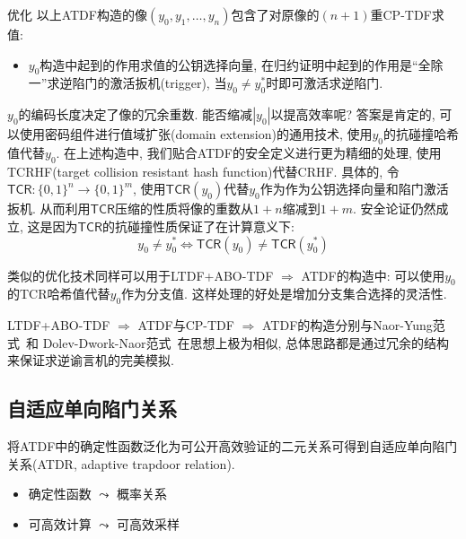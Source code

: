 \begin{remark}{优化}
以上ATDF构造的像$(y_0, y_1, \dots, y_n)$包含了对原像的$(n+1)$重CP-TDF求值:  
\begin{itemize}
    \item $y_0$构造中起到的作用求值的公钥选择向量, 在归约证明中起到的作用是``全除一''求逆陷门的激活扳机(trigger), 当$y_0 \neq y_0^*$时即可激活求逆陷门. 
\end{itemize}

$y_0$的编码长度决定了像的冗余重数. 能否缩减$|y_0|$以提高效率呢? 
答案是肯定的, 可以使用密码组件进行值域扩张(domain extension)的通用技术, 使用$y_0$的抗碰撞哈希值代替$y_0$. 
在上述构造中, 我们贴合ATDF的安全定义进行更为精细的处理, 使用TCRHF(target collision resistant hash function)代替CRHF. 
具体的, 令$\mathsf{TCR}: \{0,1\}^n \rightarrow \{0,1\}^m$, 
使用$\mathsf{TCR}(y_0)$代替$y_0$作为作为公钥选择向量和陷门激活扳机. 
从而利用$\mathsf{TCR}$压缩的性质将像的重数从$1+n$缩减到$1+m$.
安全论证仍然成立, 这是因为$\mathsf{TCR}$的抗碰撞性质保证了在计算意义下: 
\begin{equation*}
    y_0 \neq y_0^* \Longleftrightarrow \mathsf{TCR}(y_0) \neq \mathsf{TCR}(y_0^*)  
\end{equation*}   

类似的优化技术同样可以用于LTDF+ABO-TDF $\Rightarrow$ ATDF的构造中: 可以使用$y_0$的TCR哈希值代替$y_0$作为分支值. 
这样处理的好处是增加分支集合选择的灵活性.      
\end{remark}

\begin{note}
LTDF+ABO-TDF $\Rightarrow$ ATDF与CP-TDF $\Rightarrow$ ATDF的构造分别与Naor-Yung范式~\cite{NY-STOC-1990}和
Dolev-Dwork-Naor范式~\cite{DDN-STOC-1991}在思想上极为相似, 总体思路都是通过冗余的结构来保证求逆谕言机的完美模拟.  
\end{note}


\subsection*{自适应单向陷门关系}
将ATDF中的确定性函数泛化为可公开高效验证的二元关系可得到自适应单向陷门关系(ATDR, adaptive trapdoor relation).  
\begin{itemize}
    \item 确定性函数 $\leadsto$ 概率关系
    \item 可高效计算 $\leadsto$ 可高效采样 
\end{itemize}


